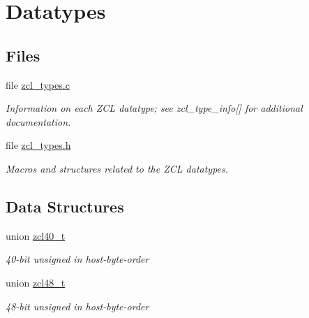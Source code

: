 \hypertarget{group__zcl__types}{}\section{Datatypes}
\label{group__zcl__types}
\subsection*{Files}
\begin{DoxyCompactItemize}
\item 
file \hyperlink{zcl__types_8c}{zcl\+\_\+types.\+c}
\begin{DoxyCompactList}\small\item\em Information on each Z\+CL datatype; see zcl\+\_\+type\+\_\+info\mbox{[}\mbox{]} for additional documentation. \end{DoxyCompactList}\item 
file \hyperlink{zcl__types_8h}{zcl\+\_\+types.\+h}
\begin{DoxyCompactList}\small\item\em Macros and structures related to the Z\+CL datatypes. \end{DoxyCompactList}\end{DoxyCompactItemize}
\subsection*{Data Structures}
\begin{DoxyCompactItemize}
\item 
union \hyperlink{unionzcl40__t}{zcl40\+\_\+t}
\begin{DoxyCompactList}\small\item\em 40-\/bit unsigned in host-\/byte-\/order \end{DoxyCompactList}\item 
union \hyperlink{unionzcl48__t}{zcl48\+\_\+t}
\begin{DoxyCompactList}\small\item\em 48-\/bit unsigned in host-\/byte-\/order \end{DoxyCompactList}\end{DoxyCompactItemize}
